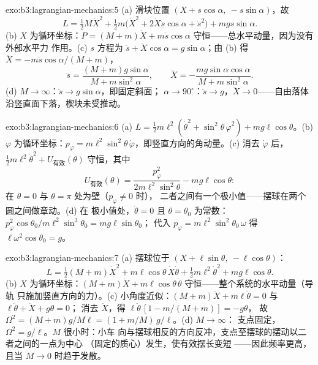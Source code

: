 \begin{solution}{exo:b3:lagrangian-mechanics:5}
(a) 滑块位置 $(X + s\cos\alpha,\ -s\sin\alpha)$，故
\[
L = \tfrac12 M\dot X^2 + \tfrac12 m\big(\dot X^2 +
2\dot X\dot s\cos\alpha + \dot s^2\big) + mgs\sin\alpha .
\]
(b) $X$ 为循环坐标：$P = (M + m)\dot X + m\dot s\cos\alpha$
守恒——总水平动量，因为没有外部水平力
作用。(c) $s$ 方程为 $\ddot s + \ddot
X\cos\alpha = g\sin\alpha$；由 (b) 得 $\ddot X = -m\ddot s\cos\alpha/(M +
m)$，
\[
\ddot s = \frac{(M + m)g\sin\alpha}{M + m\sin^2\alpha} , \qquad
\ddot X = -\frac{mg\sin\alpha\cos\alpha}{M + m\sin^2\alpha} .
\]
(d) $M \to \infty$：$\ddot s \to g\sin\alpha$，即固定斜面；
$\alpha \to 90^\circ$：$\ddot s \to g$，$\ddot X \to 0$——自由落体
沿竖直面下落，楔块未受推动。
\end{solution}

\begin{solution}{exo:b3:lagrangian-mechanics:6}
(a) $L = \tfrac12 m\ell^2(\dot\theta^2 + \sin^2\theta\,\dot\varphi^2) +
mg\ell\cos\theta$。(b) $\varphi$ 为循环坐标：$p_\varphi =
m\ell^2\sin^2\theta\,\dot\varphi$，即竖直方向的角动量。(c)
消去 $\dot\varphi$ 后，$\tfrac12 m\ell^2\dot\theta^2 +
U_{\text{有效}}(\theta)$ 守恒，其中
\[
U_{\text{有效}}(\theta) = \frac{p_\varphi^2}{2m\ell^2\sin^2\theta}
 - mg\ell\cos\theta :
\]
在 $\theta = 0$ 与 $\theta = \pi$ 处为壁（$p_\varphi \neq 0$ 时），
二者之间有一个极小值——摆球在两个圆之间做章动。(d) 在
极小值处，$\dot\theta = 0$ 且 $\theta = \theta_0$ 为常数：
$p_\varphi^2\cos\theta_0/m\ell^2\sin^3\theta_0 = mg\ell\sin\theta_0$；
代入 $p_\varphi = m\ell^2\sin^2\theta_0\,\omega$ 得
$\ell\omega^2\cos\theta_0 = g$。
\end{solution}

\begin{solution}{exo:b3:lagrangian-mechanics:7}
(a) 摆球位于 $(X + \ell\sin\theta,\ -\ell\cos\theta)$：
\[
L = \tfrac12(M + m)\dot X^2 + m\ell\cos\theta\,\dot X\dot\theta
 + \tfrac12 m\ell^2\dot\theta^2 + mg\ell\cos\theta .
\]
(b) $X$ 为循环坐标：$(M + m)\dot X + m\ell\cos\theta\,\dot\theta$
守恒——整个系统的水平动量（导轨
只施加竖直方向的力）。(c) 小角度近似：$(M + m)\ddot X +
m\ell\ddot\theta = 0$ 与 $\ell\ddot\theta + \ddot X + g\theta = 0$；
消去 $\ddot X$，得 $\ell\ddot\theta\,[1 - m/(M + m)] = -g\theta$，
故 $\Omega^2 = (M + m)g/M\ell = (1 + m/M)\,g/\ell$。(d) $M \to \infty$：
支点固定，$\Omega^2 = g/\ell$。$M$ 很小时：小车
向与摆球相反的方向反冲，支点至摆球的摆动以二者之间的一点为中心
（固定的质心）发生，使有效摆长变短
——因此频率更高，且当 $M \to 0$ 时趋于发散。
\end{solution}

